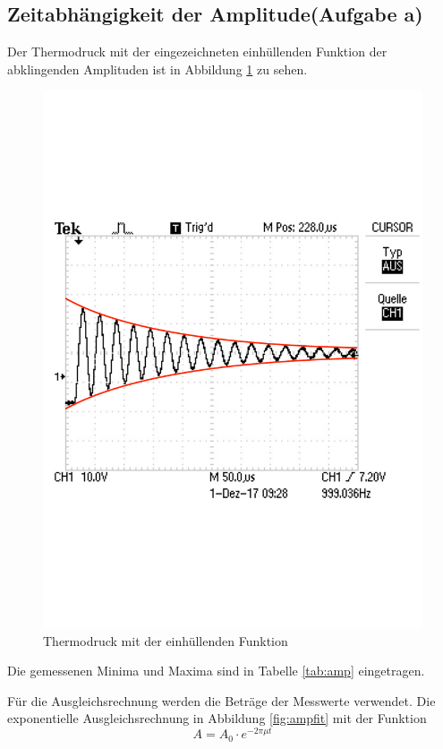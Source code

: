 \subsection{Zeitabhängigkeit der Amplitude(Aufgabe a)}
Der Thermodruck mit der eingezeichneten einhüllenden Funktion der abklingenden Amplituden ist in Abbildung \ref{fig:amp} zu sehen.
\begin{figure}[h!]
  \centering
  \includegraphics[width=\textwidth]{amp.pdf}
  \caption{Thermodruck mit der einhüllenden Funktion}
  \label{fig:amp}
\end{figure}
Die gemessenen Minima und Maxima sind in Tabelle \ref{tab:amp} eingetragen.

Für die Ausgleichsrechnung werden die Beträge der Messwerte verwendet.
Die exponentielle Ausgleichsrechnung in Abbildung \ref{fig:ampfit} mit der Funktion
\begin{equation*}
  A=A_{0} \cdot e^{-2 \pi \mu t}
\end{equation*}
